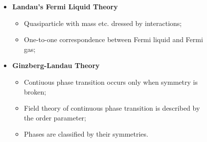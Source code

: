 \documentclass[10pt,aspectratio=43,xcolor=x11names,t]{beamer}%
\begin{document}
\begin{frame}
\begin{columns}
\begin{column}{0.35\textwidth}
\begin{figure}[!htp]
					\end{figure}
				\end{column}
				\begin{column}{0.6\textwidth}
					\begin{itemize}
						\item \textbf{Landau's Fermi Liquid Theory}
						\begin{itemize}
							\item Quasiparticle with mass etc. dressed by interactions;
							\item One-to-one correspondence between Fermi liquid and Fermi gas;
						\end{itemize}
						\item \textbf{Ginzberg-Landau Theory}
						\begin{itemize}
							\item Contiuous phase transition occurs only when symmetry is broken; 
							\item Field theory of continuous phase transition is described by the order parameter;
							\item Phases are classified by their symmetries.
						\end{itemize}
					\end{itemize}
				\end{column}
			\end{columns}
		\end{frame}
		
\end{document}
